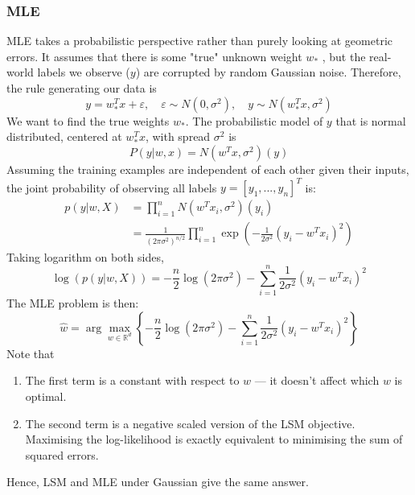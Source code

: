 \documentclass[../Probability.tex]{subfiles}
\begin{document}
\subsubsection{MLE}
MLE takes a probabilistic perspective rather than purely looking at geometric errors. It assumes that there is some "true" unknown weight $w_*$ , but the real-world labels we observe ($y$) are corrupted by random Gaussian noise.\newline
Therefore, the rule generating our data is
$$y = w_*^T x + \varepsilon, \quad  \varepsilon \sim N(0, \sigma^2), \quad y \sim N(w_*^T x, \sigma^2)$$
We want to find the true weights $w_*$.\newline
The probabilistic model of $y$ that is normal distributed, centered at $w_*^T x$, with spread $\sigma^2$ is
$$P(y|w,x)=N(w^T x,\sigma^2)(y)$$
Assuming the training examples are independent of each other given their inputs, the joint probability of observing all labels $y = [y_1, ..., y_n]^T$ is:
\begin{align*}
    p(y|w,X)&=\prod_{i=1}^n N(w^T x_i, \sigma^2)(y_i)\\
    &= \frac{1}{(2\pi\sigma^2)^{n/2}} \prod_{i=1}^n \exp\left(-\frac{1}{2\sigma^2}(y_i - w^T x_i)^2\right)
\end{align*}
Taking logarithm on both sides,
$$\log(p(y|w,X)) = -\frac{n}{2}\log(2\pi\sigma^2) - \sum_{i=1}^n \frac{1}{2\sigma^2}(y_i - w^T x_i)^2$$
The MLE problem is then:
$$\hat{w} = \arg \max_{w\in\mathbb{R}^d} \left\{-\frac{n}{2}\log(2\pi\sigma^2) - \sum_{i=1}^n \frac{1}{2\sigma^2}(y_i - w^T x_i)^2\right\}$$
Note that
\begin{enumerate}
    \item The first term is a constant with respect to $w$ — it doesn't affect which $w$ is optimal.
    \item The second term is a negative scaled version of the LSM objective. Maximising the log-likelihood is exactly equivalent to minimising the sum of squared errors.
\end{enumerate}
Hence, LSM and MLE under Gaussian give the same answer.
\end{document}
